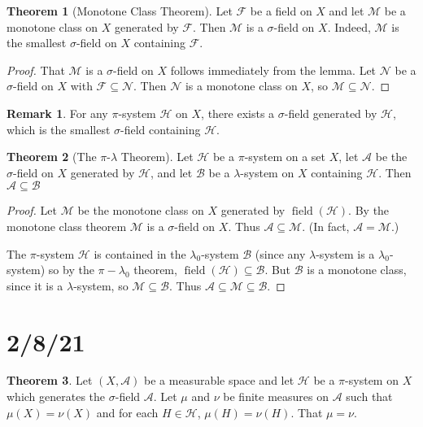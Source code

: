\documentclass{article}
\DeclareMathOperator{\field}{field}
\newcommand{\F}{\mathscr{F}}
\theoremstyle{definition}
\newtheorem{theorem}{Theorem}
\newtheorem*{remark}{Remark}
\begin{document}
\begin{theorem}[Monotone Class Theorem]
    Let $\mathscr{F}$ be a field on $X$ and let $\mathscr{M}$ be a monotone class on $X$ generated by $\mathscr{F}$. Then $\mathscr{M}$ is a $\sigma$-field on $X$. Indeed, $\mathscr{M}$ is the smallest $\sigma$-field on $X$ containing $\mathscr{F}$.
\end{theorem}

\begin{proof}
    That $\mathscr{M}$ is a $\sigma$-field on $X$ follows immediately from the lemma.
    Let $\mathscr{N}$ be a $\sigma$-field on $X$ with $\F \subseteq \mathscr{N}$. Then $\mathscr{N}$ is a monotone class on $X$, so $\mathscr{M} \subseteq \mathscr{N}$.
\end{proof}

\begin{remark}
    For any $\pi$-system $\mathscr{H}$ on $X$, there exists a $\sigma$-field generated by $\mathscr{H}$, which is the smallest $\sigma$-field containing $\mathscr{H}$.
\end{remark}

\begin{theorem}[The $\pi$-$\lambda$ Theorem]
    Let $\mathscr{H}$ be a $\pi$-system on a set $X$, let $\mathscr{A}$ be the $\sigma$-field on $X$ generated by $\mathscr{H}$, and let $\mathscr{B}$ be a $\lambda$-system on $X$ containing $\mathscr{H}$. Then $\mathscr{A} \subseteq \mathscr{B}$
    \begin{proof}
        Let $\mathscr{M}$ be the monotone class on $X$ generated by $\field(\mathscr{H})$. By the monotone class theorem $\mathscr{M}$ is a $\sigma$-field on $X$. Thus $\mathscr{A} \subseteq \mathscr{M}$. (In fact, $\mathscr{A} = \mathscr{M}$.)
        
        The $\pi$-system $\mathscr{H}$ is contained in the $\lambda_0$-system $\mathscr{B}$ (since any $\lambda$-system is a $\lambda_0$-system) so by the $\pi-\lambda_0$ theorem, $\field(\mathscr{H}) \subseteq \mathscr{B}$. But $\mathscr{B}$ is a monotone class, since it is a $\lambda$-system, so $\mathscr{M} \subseteq \mathscr{B}$. Thus $\mathscr{A} \subseteq \mathscr{M} \subseteq \mathscr{B}$.
    \end{proof}
\end{theorem}

\section*{2/8/21}

\begin{theorem}
    Let $(X, \mathscr{A})$ be a measurable space and let $\mathscr{H}$ be a $\pi$-system on $X$ which generates the $\sigma$-field $\mathscr{A}$.
    Let $\mu$ and $\nu$ be finite measures on $\mathscr{A}$ such that $\mu(X) = \nu(X)$ and for each $H \in \mathscr{H}$, $\mu(H) = \nu(H)$.
    That $\mu = \nu$.
\end{theorem}
\end{document}
